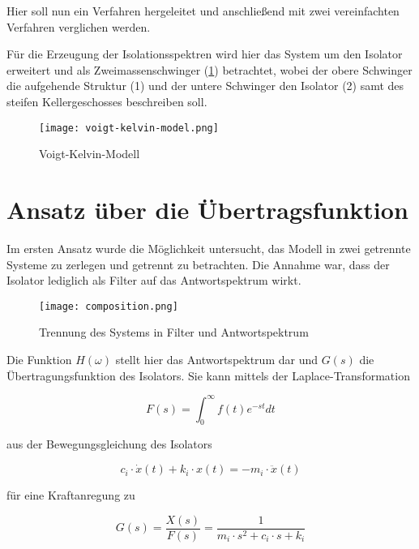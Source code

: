 Hier soll nun ein Verfahren hergeleitet und anschließend mit zwei vereinfachten Verfahren verglichen werden. 

Für die Erzeugung der Isolationsspektren wird hier das System um den Isolator erweitert und als Zweimassenschwinger (\cref{fig:vkm}) betrachtet, wobei der obere Schwinger die aufgehende Struktur (1) und der untere Schwinger den Isolator (2) samt des steifen Kellergeschosses beschreiben soll.

\begin{figure}[ht]
    \centering
    \texttt{[image: voigt-kelvin-model.png]}
    \caption{Voigt-Kelvin-Modell}
    \label{fig:vkm}
\end{figure}

\section{Ansatz über die Übertragsfunktion}
\label{sec:ansatzfunktion}

Im ersten Ansatz wurde die Möglichkeit untersucht, das Modell in zwei getrennte Systeme zu zerlegen und getrennt zu betrachten.
Die Annahme war, dass der Isolator lediglich als Filter auf das Antwortspektrum wirkt.

\begin{figure}[H]
    \centering
    \texttt{[image: composition.png]}
    \caption{Trennung des Systems in Filter und Antwortspektrum}
    \label{fig:composition}
\end{figure}

Die Funktion $H(\omega)$ stellt hier das Antwortspektrum dar und $G(s)$ die Übertragungsfunktion des Isolators.
Sie kann mittels der Laplace-Transformation

\begin{equation} \label{laplace}
F(s) = \int_{0}^{\infty} f(t)e^{-st}dt
\end{equation}

aus der Bewegungsgleichung des Isolators \cite{Kramer}

\begin{equation}\label{eq:bewegungsgleichung}
c_i \cdot \dot x(t) + k_i \cdot x(t) = - m_i \cdot \ddot x(t)
\end{equation}

für eine Kraftanregung zu

\begin{equation} \label{laplace2}
G(s)=\frac{X(s)}{F(s)} = \frac{1}{m_i \cdot s^2 + c_i \cdot s + k_i}
\end{equation}

